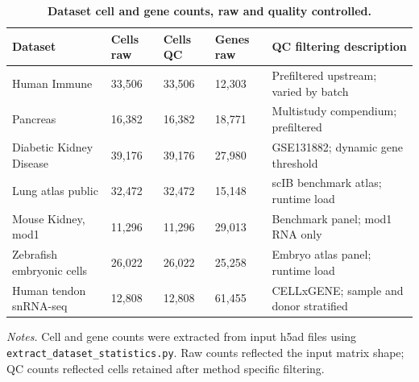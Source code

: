 \documentclass[11pt]{article}
\begin{document}
\begin{table}[htbp]
\centering
\caption{\textbf{Dataset cell and gene counts, raw and quality controlled.}}
\label{tab:s2_dataset_counts}
\scriptsize
\begin{tabularx}{\textwidth}{@{}L{0.20\textwidth} L{0.12\textwidth} L{0.12\textwidth} L{0.12\textwidth} Y@{}}
\toprule
\textbf{Dataset} & \textbf{Cells raw} & \textbf{Cells QC} & \textbf{Genes raw} & \textbf{QC filtering description} \\
\midrule
Human Immune & 33,506 & 33,506 & 12,303 & Prefiltered upstream; varied by batch \\
Pancreas & 16,382 & 16,382 & 18,771 & Multistudy compendium; prefiltered \\
Diabetic Kidney Disease & 39,176 & 39,176 & 27,980 & GSE131882; dynamic gene threshold \\
Lung atlas public & 32,472 & 32,472 & 15,148 & scIB benchmark atlas; runtime load \\
Mouse Kidney, mod1 & 11,296 & 11,296 & 29,013 & Benchmark panel; mod1 RNA only \\
Zebrafish embryonic cells & 26,022 & 26,022 & 25,258 & Embryo atlas panel; runtime load \\
Human tendon snRNA-seq & 12,808 & 12,808 & 61,455 & CELLxGENE; sample and donor stratified \\
\bottomrule
\end{tabularx}

\vspace{0.5em}
{\raggedright\scriptsize\textit{Notes.} Cell and gene counts were extracted from input h5ad files using \texttt{extract\_dataset\_statistics.py}. Raw counts reflected the input matrix shape; QC counts reflected cells retained after method specific filtering.\par}
\end{table}

\FloatBarrier
\end{document}
